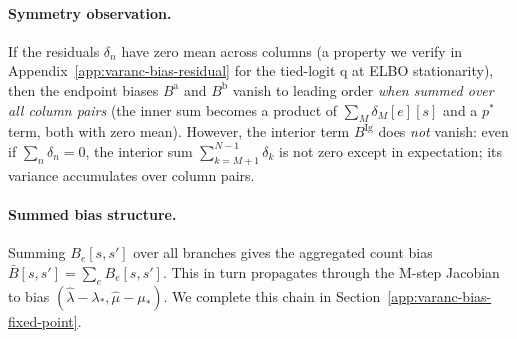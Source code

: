 \paragraph{Symmetry observation.}
If the residuals $\delta_n$ have zero mean across columns (a
property we verify in Appendix~\ref{app:varanc-bias-residual} for
the tied-logit q at ELBO stationarity), then the endpoint biases
$B^{\text{a}}$ and $B^{\text{b}}$ vanish to leading order
\emph{when summed over all column pairs} (the inner sum becomes
a product of $\sum_M \delta_M[e][s]$ and a $p^*$ term, both with
zero mean).  However, the interior term $B^{\text{Ig}}$ does
\emph{not} vanish: even if $\sum_n \delta_n = 0$, the interior
sum $\sum_{k=M+1}^{N-1} \delta_k$ is not zero except in
expectation; its variance accumulates over column pairs.

\paragraph{Summed bias structure.}
Summing $B_e[s, s']$ over all branches gives the aggregated
count bias $\bar B[s, s'] = \sum_e B_e[s, s']$.  This in turn
propagates through the M-step Jacobian to bias
$(\hat\lambda - \lambda_*, \hat\mu - \mu_*)$.  We complete this
chain in Section~\ref{app:varanc-bias-fixed-point}.

